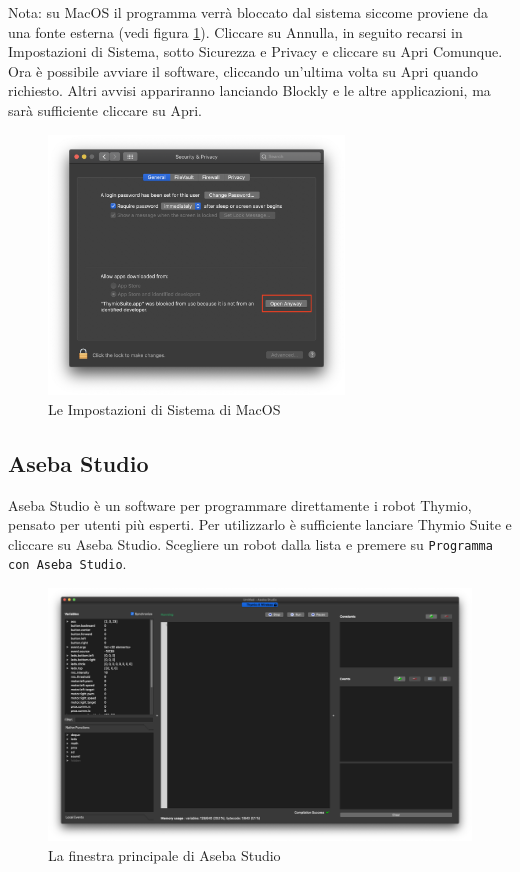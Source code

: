 \documentclass[12pt]{article}
\begin{document}
	Nota: su MacOS il programma verrà bloccato dal sistema siccome proviene da una fonte esterna (vedi figura \ref{macErr}). Cliccare su Annulla, in seguito recarsi in Impostazioni di Sistema, sotto Sicurezza e Privacy e cliccare su Apri Comunque. Ora è possibile avviare il software, cliccando un'ultima volta su Apri quando richiesto. Altri avvisi appariranno lanciando Blockly e le altre applicazioni, ma sarà sufficiente cliccare su Apri.
		
	\begin{figure}[H]
		\centering
			\includegraphics[width=0.7\textwidth]{img/macWarn.png}
			\caption{Le Impostazioni di Sistema di MacOS}
			\label{macErr}
	\end{figure}
		
	\subsection{Aseba Studio}
	
		Aseba Studio è un software per programmare direttamente i robot Thymio, pensato per utenti più esperti. Per utilizzarlo è sufficiente lanciare Thymio Suite e cliccare su Aseba Studio. Scegliere un robot dalla lista e premere su \texttt{Programma con Aseba Studio}.
		
		\begin{figure}[H]
			\includegraphics[width=\textwidth]{img/asebaStudio.png}
			\caption{La finestra principale di Aseba Studio}
			\label{main_aseba}
		\end{figure}		
\end{document}

